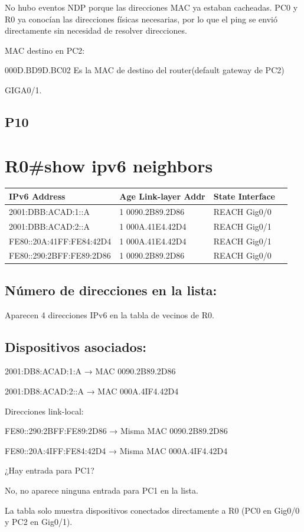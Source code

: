 \documentclass{article}
\begin{document}
No hubo eventos NDP porque las direcciones MAC ya estaban cacheadas. PC0 y R0 ya conocían las direcciones físicas necesarias, por lo que el ping se envió directamente sin necesidad de resolver direcciones.

MAC destino en PC2:

000D.BD9D.BC02	 Es la MAC de destino del router(default gateway de PC2)

GIGA0/1.

\subsection*{P10}
\section*{R0\#show ipv6 neighbors}
\begin{tabular}{|l|l|l|l|}
\hline
IPv6 Address & Age Link-layer Addr & State Interface \\
\hline
2001:DBB:ACAD:1::A & 1 0090.2B89.2D86 & REACH Gig0/0 \\
2001:DBB:ACAD:2::A & 1 000A.41E4.42D4 & REACH Gig0/1 \\
FE80::20A:41FF:FE84:42D4 & 1 000A.41E4.42D4 & REACH Gig0/1 \\
FE80::290:2BFF:FE89:2D86 & 1 0090.2B89.2D86 & REACH Gig0/0 \\
\hline
\end{tabular}

\subsection*{Número de direcciones en la lista:}
Aparecen 4 direcciones IPv6 en la tabla de vecinos de R0.

\subsection*{Dispositivos asociados:}
2001:DB8:ACAD:1:A → MAC  0090.2B89.2D86

2001:DB8:ACAD:2::A → MAC  000A.4IF4.42D4

Direcciones link-local:

FE80::290:2BFF:FE89:2D86 → Misma MAC  0090.2B89.2D86

FE80::20A:4IFF:FE84:42D4 → Misma MAC  000A.4IF4.42D4

¿Hay entrada para PC1?

No, no aparece ninguna entrada para PC1 en la lista.

La tabla solo muestra dispositivos conectados directamente a R0 (PC0 en Gig0/0 y PC2 en Gig0/1).
\end{document}
